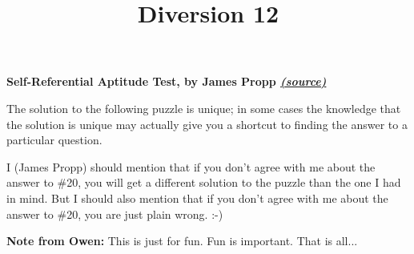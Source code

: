 \documentclass[twoside]{article}
\title{\sc Diversion 12}
\begin{document}
\maketitle

\begin{center}
\textbf{Self-Referential Aptitude Test, by James Propp \textit{\href{http://faculty.uml.edu/jpropp/srat-Q.txt}{(source)}}}
\end{center}

The solution to the following puzzle is unique; in some cases the
knowledge that the solution is unique may actually give you a shortcut 
to finding the answer to a particular question.

I (James Propp) should mention that if you don't agree with me about the answer to \#20, 
you will get a different solution to the puzzle than the one I had in mind.  
But I should also mention that if you don't agree with me about the answer 
to \#20, you are just plain wrong.  :-)

\textbf{Note from Owen:} This is just for fun. Fun is important. That is all...
\end{document}
